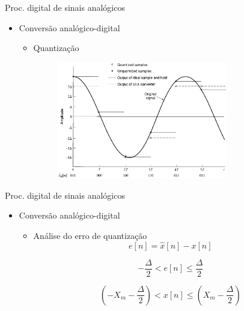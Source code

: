 \documentclass[
size=11pt,
paper=screen,
mode=present,
display=slidesnotes,
style=paintings,
nopagebreaks,
blackslide,
fleqn]{powerdot}
\begin{document}
\begin{slide}{Proc. digital de sinais anal\'ogicos}
\begin{itemize}
   \item Conversão analógico-digital
   \begin{itemize}
      \item Quantização 
      \begin{figure}
        \centering
         \includegraphics[width = 0.75\textwidth]{figs/ad_quantz2.eps}
      \end{figure}

   \end{itemize}
\end{itemize}
\end{slide}

\begin{slide}{Proc. digital de sinais anal\'ogicos}
\begin{itemize}
   \item Conversão analógico-digital
   \begin{itemize}
      \item Análise do erro de quantização
      \begin{equation}
        e[n] = \hat x[n] - x[n]
      \end{equation}

        \begin{equation}
         -\frac{\Delta}{2}<e[n]\leq \frac{\Delta}{2}
        \end{equation}

        \begin{equation}
         \left (-X_m-\frac{\Delta}{2}\right )<x[n]\leq \left (X_m-\frac{\Delta}{2}\right )
        \end{equation}



   \end{itemize}
\end{itemize}
\end{slide}
\end{document}
